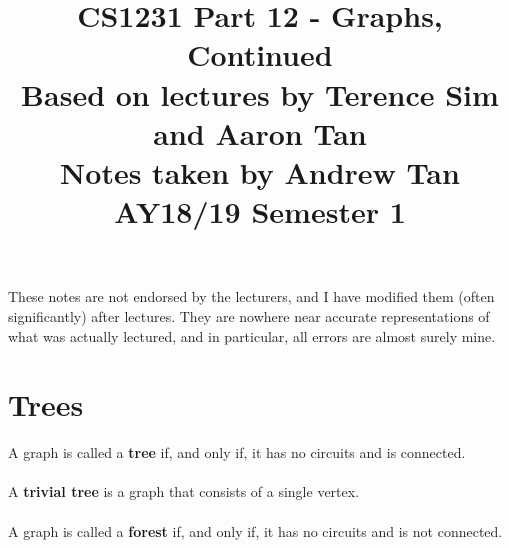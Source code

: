 \documentclass[a4paper]{article}
\title{%
	CS1231 Part 12 - Graphs, Continued  \\
	\large Based on lectures by Terence Sim and Aaron Tan
	\\ Notes taken by Andrew Tan
	\\ AY18/19 Semester 1
	\\ }
\author{}
\date{\vspace{-5ex}}
\begin{document}
\maketitle

\begin{center}\begin{minipage}[c]{0.9\textwidth}\centering\footnotesize These notes are not endorsed by the lecturers, and I have modified them (often significantly) after lectures. They are nowhere near accurate representations of what was actually lectured, and in particular, all errors are almost surely mine.\end{minipage}\end{center}

\section{Trees}
A graph is called a \textbf{tree} if, and only if, it has no circuits and is connected.\\\\
A \textbf{trivial tree} is a graph that consists of a single vertex.\\\\
A graph is called a \textbf{forest} if, and only if, it has no circuits and is not connected.
\end{document}
